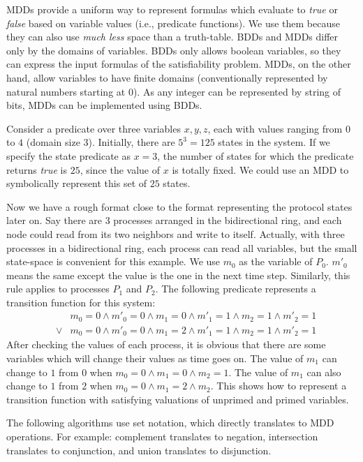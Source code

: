MDDs provide a uniform way to represent formulas which evaluate to {\it true} or {\it false} based on variable values (i.e., predicate functions).
We use them because they can also use {\em much less} space than a truth-table.
BDDs and MDDs differ only by the domains of variables. BDDs only allows boolean variables, so they can express the input formulas of the satisfiability problem.
MDDs, on the other hand, allow variables to have finite domains (conventionally represented by natural numbers starting at $0$).
As any integer can be represented by string of bits, MDDs can be implemented using BDDs.

Consider a predicate over three variables $x, y, z$, each with values ranging from $0$ to $4$ (domain size 3). Initially, there are $5^3 = 125$ states in the system. If we specify the state predicate as $x=3$, the number of states for which the predicate returns {\it true} is $25$, since the value of $x$ is totally fixed. We could use an MDD to symbolically represent this set of $25$ states.

Now we have a rough format close to the format representing the protocol states later on. Say there are 3 processes arranged in the bidirectional ring, and each node could read from its two neighbors and write to itself. Actually, with three processes in a bidirectional ring, each process can read all variables, but the small state-space is convenient for this example. We use $m_0$ as the variable of $P_0$. $m'_0$ means the same except the value is the one in the next time step. Similarly, this rule applies to processes $P_1$ and $P_2$. The following predicate represents a transition function for this system:
\begin{eqnarray*}
 & & m_0 = 0 \wedge m'_0 = 0 \wedge m_1 = 0 \wedge m'_1 = 1 \wedge m_2 = 1 \wedge m'_2 = 1 \\
 & \vee & m_0 = 0 \wedge m'_0 = 0 \wedge m_1 = 2 \wedge m'_1 = 1 \wedge m_2 = 1 \wedge m'_2 = 1
\end{eqnarray*}
After checking the values of each process, it is obvious that there are some variables which will change their values as time goes on. The value of $m_1$ can change to $1$ from $0$ when $m_0 = 0 \wedge m_1 = 0 \wedge m_2 = 1$. The value of $m_1$ can also change to $1$ from $2$ when $m_0 = 0 \wedge m_1 = 2 \wedge m_2$. This shows how to represent a transition function with satisfying valuations of unprimed and primed variables.

The following algorithms use set notation, which directly translates to MDD operations.
For example: complement translates to negation, intersection translates to conjunction, and union translates to disjunction.

